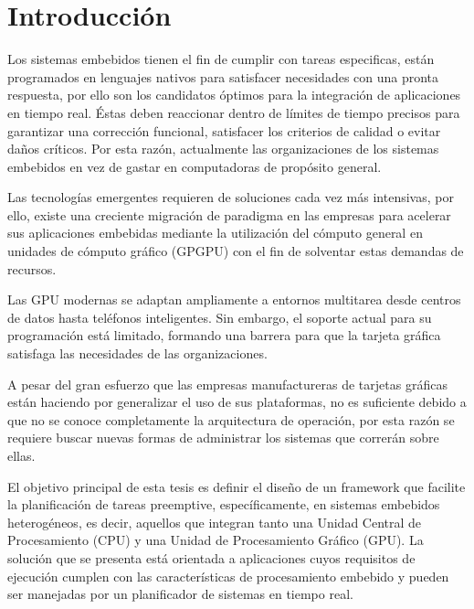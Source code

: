 

\chapter{Introducción}
\label{cha:Introducción}

\graphicspath{{figures/}}

Los sistemas embebidos tienen el fin de cumplir con tareas especificas, están programados en lenguajes nativos para satisfacer necesidades con una pronta respuesta, por ello son los candidatos óptimos para la integración de aplicaciones en tiempo real. Éstas deben reaccionar dentro de límites de tiempo precisos para garantizar una corrección funcional, satisfacer los criterios de calidad o evitar daños críticos. Por esta razón, actualmente las organizaciones de los sistemas embebidos en vez de gastar en computadoras de propósito general.
\newline

Las tecnologías emergentes requieren de soluciones cada vez más intensivas, por ello, existe una creciente migración de paradigma en las empresas para acelerar sus aplicaciones embebidas mediante la utilización del cómputo general en unidades de cómputo gráfico (GPGPU) con el fin de solventar estas demandas de recursos.
\newline

Las GPU modernas se adaptan ampliamente a entornos multitarea desde centros de datos hasta teléfonos inteligentes. Sin embargo, el soporte actual para su programación está limitado, formando una barrera para que la tarjeta gráfica satisfaga las necesidades de las organizaciones.
\newline

A pesar del gran esfuerzo que las empresas manufactureras de tarjetas gráficas están haciendo por generalizar el uso de sus plataformas, no es suficiente debido a que no se conoce completamente la arquitectura de operación, por esta razón se requiere buscar nuevas formas de administrar los sistemas que correrán sobre ellas.
\newline

El objetivo principal de esta tesis es definir el diseño de un framework que facilite la planificación de tareas preemptive, específicamente, en sistemas embebidos heterogéneos, es decir, aquellos que integran tanto una Unidad Central de Procesamiento (CPU) y una Unidad de Procesamiento Gráfico (GPU). La solución que se presenta está orientada a aplicaciones cuyos requisitos de ejecución cumplen con las características de procesamiento embebido y pueden ser manejadas por un planificador de sistemas en tiempo real.
\newline

